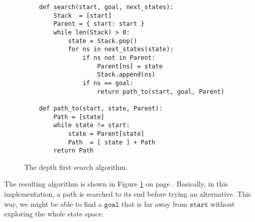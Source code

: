 \begin{figure}[!ht]
\centering
\begin{verbatim}
    def search(start, goal, next_states):
        Stack  = [start]
        Parent = { start: start }
        while len(Stack) > 0:
            state = Stack.pop()
            for ns in next_states(state):
                if ns not in Parent:
                    Parent[ns] = state
                    Stack.append(ns)
                if ns == goal:
                    return path_to(start, goal, Parent)
    
    def path_to(start, state, Parent):
        Path = [state]
        while state != start:
            state = Parent[state]
            Path  = [ state ] + Path
        return Path
\end{verbatim}
\vspace*{-0.3cm}
\caption{The depth first search algorithm.}
\label{fig:Depth-First-Search-Stack.ipynb}
\end{figure}
\FloatBarrier

The resulting algorithm is shown in Figure
\ref{fig:Depth-First-Search-Stack.ipynb} on page \pageref{fig:Depth-First-Search-Stack.ipynb}.  Basically, in this
implementation, a path is searched to its end before trying an alternative.  This way, we might be able to find a
$\texttt{goal}$ that is far away from $\texttt{start}$ without exploring the whole state space.



